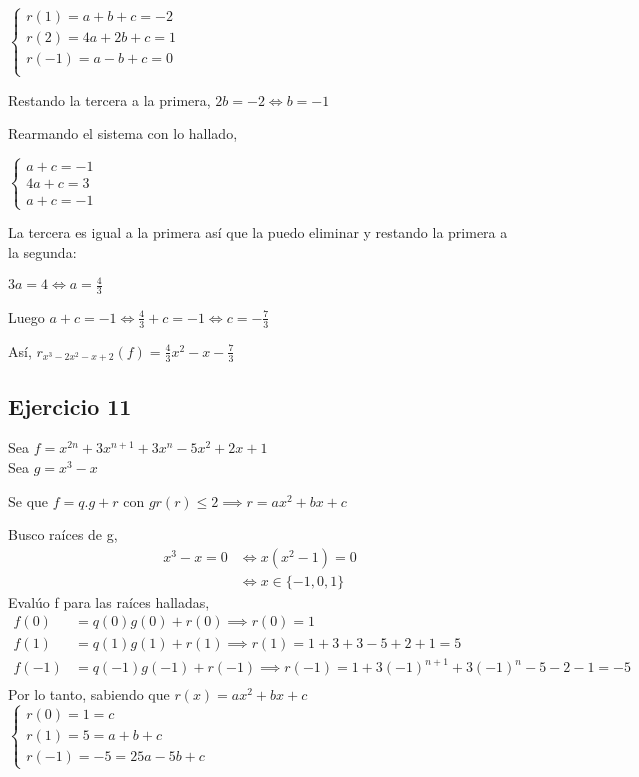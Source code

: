 $ \begin{cases}
    r(1) = a + b + c = -2 \\
    r(2) = 4a + 2b + c = 1 \\
    r(-1) = a - b + c = 0 \\
\end{cases} $

Restando la tercera a la primera, $ 2b = -2 \iff b = -1 $

Rearmando el sistema con lo hallado,

$ \begin{cases}
    a + c = -1 \\
    4a + c = 3 \\
    a + c = -1
\end{cases} $

La tercera es igual a la primera así que la puedo eliminar y restando la primera a la segunda:

$ 3a = 4 \iff a = \frac{4}{3} $

Luego $ a + c = -1 \iff \frac{4}{3} + c = -1 \iff c = -\frac{7}{3} $

Así, $ r_{x^3-2x^2-x+2}(f) = \frac{4}{3}x^2 - x - \frac{7}{3} $

\subsection{Ejercicio 11}

Sea $ f = x^{2n} + 3x^{n+1} + 3x^n - 5x^2 + 2x + 1 $ \\
Sea $ g = x^3 - x $

Se que $ f = q.g + r $ con $ gr(r) \leq 2 \implies r = ax^2 + bx + c $

Busco raíces de g,
\begin{align*}
    x^3 - x = 0 &\iff x(x^2 - 1) = 0  \\
    &\iff x \in \{ -1,0,1 \}
\end{align*}
Evalúo f para las raíces halladas,
\begin{align*}
    f(0) &= q(0)g(0) + r(0) \implies r(0) = 1 \\
    f(1) &= q(1)g(1) + r(1) \implies r(1) = 1+3+3-5+2+1 = 5 \\ 
    f(-1) &= q(-1)g(-1) + r(-1) \implies r(-1) = 1+3(-1)^{n+1} + 3(-1)^n -5 - 2 - 1 = -5 \\ 
\end{align*}
Por lo tanto, sabiendo que $ r(x) = ax^2 + bx + c $
$ \begin{cases}
    r(0) = 1 = c \\
    r(1) = 5 = a+b+c \\
    r(-1) = -5 = 25a - 5b + c
\end{cases} $


